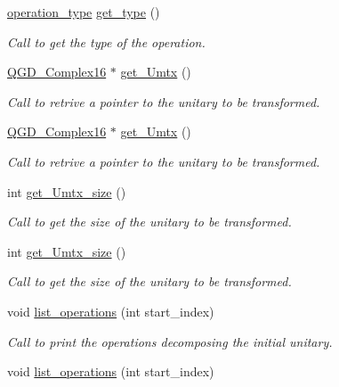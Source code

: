 \begin{DoxyCompactItemize}
\hyperlink{operations_2include_2_operation_8h_ad99e62941c8e4b13e5fc45ecaaf65eff}{operation\+\_\+type} \hyperlink{class_operation_acc601a7a00616fd6e2a61f61e084afac}{get\+\_\+type} ()
\begin{DoxyCompactList}\small\item\em Call to get the type of the operation. \end{DoxyCompactList}\item 
\hyperlink{struct_q_g_d___complex16}{Q\+G\+D\+\_\+\+Complex16} $\ast$ \hyperlink{class_decomposition___base_ad1e8fca5e5710d3a59f10ed6c523a502}{get\+\_\+\+Umtx} ()
\begin{DoxyCompactList}\small\item\em Call to retrive a pointer to the unitary to be transformed. \end{DoxyCompactList}\item 
\hyperlink{struct_q_g_d___complex16}{Q\+G\+D\+\_\+\+Complex16} $\ast$ \hyperlink{class_decomposition___base_a8375551739dde405c4e121ae0bbb09bf}{get\+\_\+\+Umtx} ()
\begin{DoxyCompactList}\small\item\em Call to retrive a pointer to the unitary to be transformed. \end{DoxyCompactList}\item 
int \hyperlink{class_decomposition___base_a3a1f83b85fd9e7e67a89a79b8cdc1e4a}{get\+\_\+\+Umtx\+\_\+size} ()
\begin{DoxyCompactList}\small\item\em Call to get the size of the unitary to be transformed. \end{DoxyCompactList}\item 
int \hyperlink{class_decomposition___base_a3a1f83b85fd9e7e67a89a79b8cdc1e4a}{get\+\_\+\+Umtx\+\_\+size} ()
\begin{DoxyCompactList}\small\item\em Call to get the size of the unitary to be transformed. \end{DoxyCompactList}\item 
void \hyperlink{class_decomposition___base_a4c6c81d70f49ee249aa455a4f2718ee2}{list\+\_\+operations} (int start\+\_\+index)
\begin{DoxyCompactList}\small\item\em Call to print the operations decomposing the initial unitary. \end{DoxyCompactList}\item 
void \hyperlink{class_decomposition___base_a4c6c81d70f49ee249aa455a4f2718ee2}{list\+\_\+operations} (int start\+\_\+index)

\end{DoxyCompactItemize}
